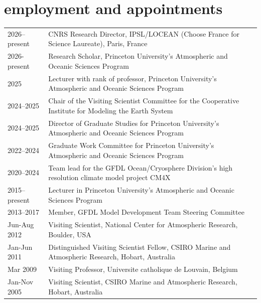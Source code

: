 \documentclass{article}
\begin{document}
\vspace{-.5cm}
\section*{\sc \color{Maroon} employment and appointments} 
\vspace{-.25cm}
\begin{tabular}{ll}
 2026--present & CNRS Research Director, IPSL/LOCEAN (Choose France for Science Laureate), Paris, France 
  \\
  2026-present & Research Scholar, Princeton University's Atmospheric and Oceanic Sciences Program 
    \\
  2025 & Lecturer with rank of professor, Princeton University's Atmospheric and Oceanic Sciences Program 
  \\
2024--2025 & Chair of the Visiting Scientist  Committee for the Cooperative Institute for Modeling the Earth System 
  \\
  
  
   2024--2025 & Director of Graduate Studies for Princeton University's Atmospheric and Oceanic Sciences Program
  \\
  
  2022--2024 & Graduate Work Committee for Princeton University's Atmospheric and Oceanic Sciences Program
  \\
  
  2020--2024 & Team lead for the GFDL Ocean/Cryosphere Division's high resolution climate model project CM4X 
  \\

  2015--present & Lecturer in Princeton University's Atmospheric and Oceanic Sciences Program
  \\
 
  2013--2017  & Member, GFDL Model Development Team Steering Committee  \\
  
  Jun-Aug 2012  & Visiting Scientist, National Center for Atmospheric
                  Research, Boulder, USA \\

  Jan-Jun 2011   & Distinguished Visiting Scientist Fellow, CSIRO Marine and Atmospheric Research, Hobart, Australia \\
 
  Mar 2009         & Visiting Professor, Universite catholique de Louvain, Belgium \\
 
  Jan-Nov 2005   & Visiting Scientist, CSIRO Marine and Atmospheric  Research, Hobart, Australia \\
 

\end{tabular}
\end{document}
